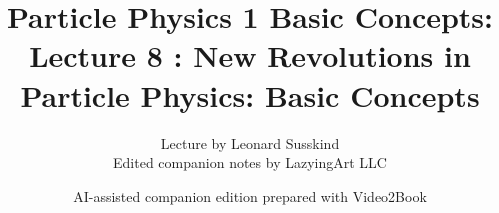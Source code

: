 \documentclass[11pt,oneside]{book}
\begin{document}
\frontmatter
\title{Particle Physics 1 Basic Concepts: Lecture 8 : New Revolutions in Particle Physics: Basic Concepts}
\author{Lecture by Leonard Susskind\\Edited companion notes by LazyingArt LLC}
\date{AI-assisted companion edition prepared with Video2Book}
\maketitle
\clearpage
\mainmatter

\end{document}
